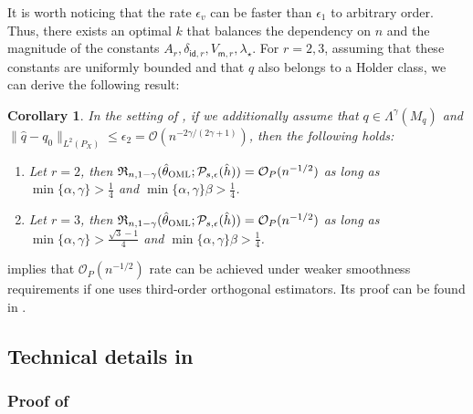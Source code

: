 \documentclass{article}
\def\eps{{\epsilon}}
\def\gO{{\mathcal{O}}}
\def\gP{{\mathcal{P}}}
\newtheorem{corollary}{Corollary}[section]
\newcommand{\oml}{\textsc{OML}}
\begin{document}
It is worth noticing that the rate $\eps_v$ can be faster than $\eps_1$ to arbitrary order. Thus, there exists an optimal $k$ that balances the dependency on $n$ and the magnitude of the constants $A_r,\delta_{\mathsf{id},r}, V_{\mathsf{m},r},\lambda_{\star}$. For $r=2,3$, assuming that these constants are uniformly bounded and that $q$ also belongs to a Holder class, we can derive the following result:

\begin{corollary}
    \label{thm:heteroscedastic-rate-informal}
    In the setting of , if we additionally assume that $q\in\Lambda^{\gamma}(M_q)$ and $\|\hat{q}-q_0\|_{L^2(P_X)}\leq\eps_2=\gO(n^{-2\gamma/(2\gamma+1)})$, then the following holds:
    \begin{enumerate}[(1).]
        \item Let $r=2$, then $\mathfrak{R}_{n,1-\gamma} (\hat{\theta}_{\oml};\gP_{s,\eps}(\hat{h})) = \gO_P(n^{-1/2})$ as long as $\min\{\alpha,\gamma\}>\frac{1}{4}$ and $\min\{\alpha,\gamma\}\beta>\frac{1}{4}$.
        \item Let $r=3$, then $\mathfrak{R}_{n,1-\gamma} (\hat{\theta}_{\oml};\gP_{s,\eps}(\hat{h})) = \gO_P(n^{-1/2})$ as long as $\min\{\alpha,\gamma\}>\frac{\sqrt{3}-1}{4}$ and $\min\{\alpha,\gamma\}\beta>\frac{1}{4}$.
    \end{enumerate}
\end{corollary}

 implies that $\gO_P(n^{-1/2})$ rate can be achieved under weaker smoothness requirements if one uses third-order orthogonal estimators. Its proof can be found in  .

\subsection{Technical details in }

\subsubsection{Proof of }
\label{subsec:proof-heteroscedastic-rate}
\end{document}
